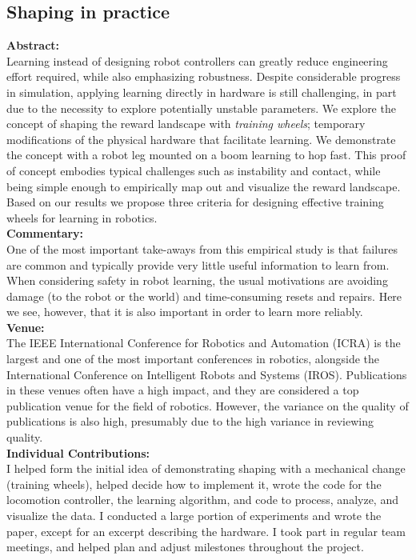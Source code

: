 \subsection{Shaping in practice}
\textbf{Abstract: } \\
Learning instead of designing robot controllers can greatly reduce engineering effort required, while also emphasizing robustness. Despite considerable progress in simulation, applying learning directly in hardware is still challenging, in part due to the necessity to explore potentially unstable parameters. We explore the concept of shaping the reward landscape with \emph{training wheels}; temporary modifications of the physical hardware that facilitate learning. We demonstrate the concept with a robot leg mounted on a boom learning to hop fast. This proof of concept embodies typical challenges such as instability and contact, while being simple enough to empirically map out and visualize the reward landscape. Based on our results we propose three criteria for designing effective training wheels for learning in robotics. \\
\textbf{Commentary: } \\
One of the most important take-aways from this empirical study is that failures are common and typically provide very little useful information to learn from. When considering safety in robot learning, the usual motivations are avoiding damage (to the robot or the world) and time-consuming resets and repairs. Here we see, however, that it is also important in order to learn more reliably. \\
\textbf{Venue: } \\
The IEEE International Conference for Robotics and Automation (ICRA) is the largest and one of the most important conferences in robotics, alongside the International Conference on Intelligent Robots and Systems (IROS). Publications in these venues often have a high impact, and they are considered a top publication venue for the field of robotics. However, the variance on the quality of publications is also high, presumably due to the high variance in reviewing quality. \\
\textbf{Individual Contributions: } \\
I helped form the initial idea of demonstrating shaping with a mechanical change (training wheels), helped decide how to implement it, wrote the code for the locomotion controller, the learning algorithm, and code to process, analyze, and visualize the data. I conducted a large portion of experiments and wrote the paper, except for an excerpt describing the hardware. I took part in regular team meetings, and helped plan and adjust milestones throughout the project.
